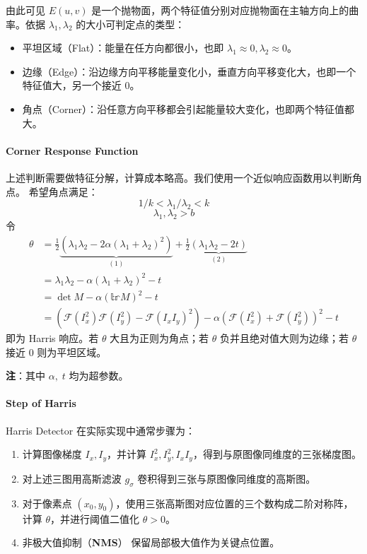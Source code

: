 由此可见 \(E(u, v)\)
是一个抛物面，两个特征值分别对应抛物面在主轴方向上的曲率。依据
\(\lambda_1, \lambda_2\) 的大小可判定点的类型：

\begin{itemize}
\tightlist
\item
  平坦区域（Flat）：能量在任方向都很小，也即
  \(\lambda_1 \approx 0, \lambda_2 \approx 0\)。
\item
  边缘（Edge）：沿边缘方向平移能量变化小，垂直方向平移变化大，也即一个特征值大，另一个接近
  0。
\item
  角点（Corner）：沿任意方向平移都会引起能量较大变化，也即两个特征值都大。
\end{itemize}

\paragraph{Corner Response Function}\label{corner-response-function}

上述判断需要做特征分解，计算成本略高。我们使用一个近似响应函数用以判断角点。
希望角点满足： \[
1/k < \lambda_1/\lambda_2 < k \qquad \tag{1}
\] \[
\lambda_1, \lambda_2 > b \qquad \tag{2}
\] 令 \[
\begin{aligned}
\theta
&= \frac{1}{2} \underbrace{(\lambda_1 \lambda_2 - 2 \alpha (\lambda_1 + \lambda_2)^2)}_{(1)}
+ \frac{1}{2} \underbrace{(\lambda_1 \lambda_2 - 2t)}_{(2)} \\
&= \lambda_1 \lambda_2 - \alpha (\lambda_1 + \lambda_2)^2 - t \\
&= \det{M} - \alpha (\mathbb{tr}M)^2 - t \\
&= (\mathcal{F}(I_x^2) \mathcal{F}(I_y^2) - \mathcal{F}(I_x I_y)^2)
- \alpha (\mathcal{F}(I_x^2) + \mathcal{F}(I_y^2))^2 - t
\end{aligned}
\] 即为 Harris 响应。若 \(\theta\) 大且为正则为角点；若 \(\theta\)
负并且绝对值大则为边缘；若 \(\theta\) 接近 0 则为平坦区域。

\textbf{注}：其中 \(\alpha, \; t\) 均为超参数。

\paragraph{Step of Harris}\label{step-of-harris}

Harris Detector 在实际实现中通常步骤为：

\begin{enumerate}
\def\labelenumi{\arabic{enumi}.}
\tightlist
\item
  计算图像梯度 \(I_x, I_y\)，并计算
  \(I_x^2, I_y^2, I_x I_y\)，得到与原图像同维度的三张梯度图。
\item
  对上述三图用高斯滤波 \(g_\sigma\) 卷积得到三张与原图像同维度的高斯图。
\item
  对于像素点
  \((x_0, y_0)\)，使用三张高斯图对应位置的三个数构成二阶对称阵，计算
  \(\theta\)，并进行阈值二值化 \(\theta > 0\)。
\item
  非极大值抑制（\textbf{NMS}） 保留局部极大值作为关键点位置。
\end{enumerate}

